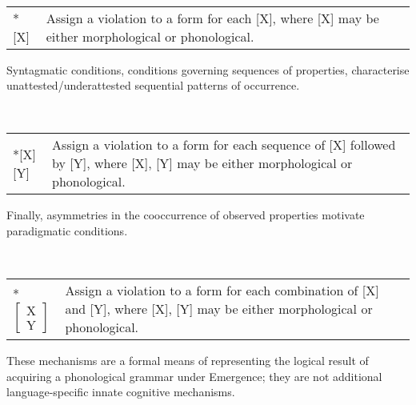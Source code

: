 \begin{example}  \label{types-schema-revised}\smallskip\\
\begin{tabularx}{\linewidth}{@{}lQ@{}}
*[X] 	& Assign a violation to a form for each [X], where [X] may be either morphological or phonological.
\end{tabularx}
\end{example}

Syntagmatic conditions, conditions governing sequences of properties, characterise unattested/underattested sequential patterns of occurrence.

\begin{example} \label{phonotactics-schema-revised}\smallskip\\
\begin{tabularx}{\linewidth}{@{}lQ@{}}
*[X][Y]& Assign a violation to a form for each  sequence of [X] followed by [Y], where [X], [Y] may be either morphological or phonological.
\end{tabularx}
\end{example}


\hspace*{-1mm}Finally, asymmetries in the cooccurrence of observed properties motivate paradigmatic conditions.

\begin{example}  \label{phonotactics-schema-paradigmatic-final}\label{paradigmatic-schema-revised}\smallskip\\
\begin{tabularx}{\linewidth}{@{}lQ@{}}
{*}$\begin{bmatrix}\textrm{X}\\\textrm{Y}\end{bmatrix}$ & Assign a violation to a form for each combination of [X] and [Y], where [X], [Y] may be either morphological or phonological.
\end{tabularx}
\end{example}

These mechanisms are a formal means of representing the logical result of acquiring a phonological grammar under Emergence; they are not additional language-specific innate cognitive mechanisms.

